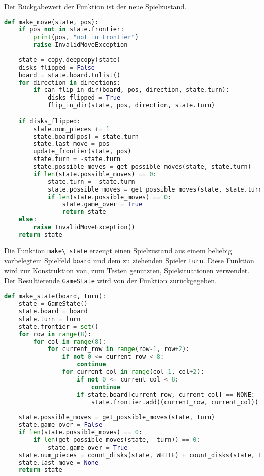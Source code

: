 Der Rückgabewert der Funktion ist der neue Spielzustand.

\begin{lstlisting}[language=Python]
def make_move(state, pos):
    if pos not in state.frontier:
        print(pos, "not in Frontier")
        raise InvalidMoveException
    
    state = copy.deepcopy(state)
    disks_flipped = False
    board = state.board.tolist()
    for direction in directions:
        if can_flip_in_dir(board, pos, direction, state.turn):
            disks_flipped = True
            flip_in_dir(state, pos, direction, state.turn)

    if disks_flipped:
        state.num_pieces += 1
        state.board[pos] = state.turn
        state.last_move = pos
        update_frontier(state, pos)
        state.turn = -state.turn
        state.possible_moves = get_possible_moves(state, state.turn)
        if len(state.possible_moves) == 0:
            state.turn = -state.turn
            state.possible_moves = get_possible_moves(state, state.turn)
            if len(state.possible_moves) == 0:
                state.game_over = True
                return state
    else:
        raise InvalidMoveException()
    return state
\end{lstlisting}

Die Funktion \passthrough{\lstinline!make\_state!} erzeugt einen
Spielzustand aus einem beliebig vorbelegtem Spielfeld
\passthrough{\lstinline!board!} und dem zu ziehenden Spieler
\passthrough{\lstinline!turn!}. Diese Funktion wird zur Konstruktion
von, zum Testen genutzten, Spielsituationen verwendet. Der Resultierende
\passthrough{\lstinline!GameState!} wird von der Funktion zurückgegeben.

\begin{lstlisting}[language=Python]
def make_state(board, turn):
    state = GameState()
    state.board = board
    state.turn = turn
    state.frontier = set()
    for row in range(8):
        for col in range(8):
            for current_row in range(row-1, row+2):
                if not 0 <= current_row < 8:
                    continue
                for current_col in range(col-1, col+2):
                    if not 0 <= current_col < 8:
                        continue
                    if state.board[current_row, current_col] == NONE:
                        state.frontier.add((current_row, current_col))
            
    state.possible_moves = get_possible_moves(state, turn)
    state.game_over = False
    if len(state.possible_moves) == 0:
        if len(get_possible_moves(state, -turn)) == 0:
            state.game_over = True
    state.num_pieces = count_disks(state, WHITE) + count_disks(state, BLACK)
    state.last_move = None
    return state
\end{lstlisting}
